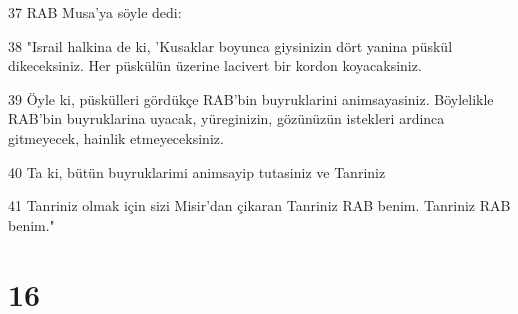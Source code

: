 \par 37 RAB Musa'ya söyle dedi:
\par 38 "Israil halkina de ki, 'Kusaklar boyunca giysinizin dört yanina püskül dikeceksiniz. Her püskülün üzerine lacivert bir kordon koyacaksiniz.
\par 39 Öyle ki, püskülleri gördükçe RAB'bin buyruklarini animsayasiniz. Böylelikle RAB'bin buyruklarina uyacak, yüreginizin, gözünüzün istekleri ardinca gitmeyecek, hainlik etmeyeceksiniz.
\par 40 Ta ki, bütün buyruklarimi animsayip tutasiniz ve Tanriniz
\par 41 Tanriniz olmak için sizi Misir'dan çikaran Tanriniz RAB benim. Tanriniz RAB benim."

\chapter{16}

